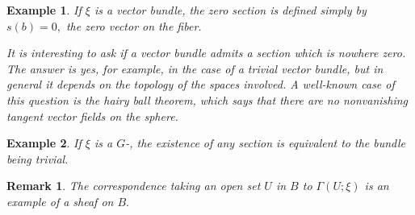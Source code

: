 \documentclass[12pt]{article}
\newtheorem{rmk}{Remark}
\newtheorem{exm}{Example}
\begin{document}
\begin{exm}
If $\xi$ is a vector bundle, the {\em zero section\/} is defined simply by
$s(b)=0,$ the zero vector on the fiber. 

It is interesting to ask if a  vector bundle admits a section which is 
nowhere zero. The answer is yes, for example, in the case of a trivial vector 
bundle, but in general it depends on the topology of the spaces involved.
A well-known case of this question is the {\em hairy ball theorem,} which
says that there are no nonvanishing tangent vector fields on the sphere.
\end{exm}

\begin{exm}
If $\xi$ is a  $G$-, the existence of {\em any\/} section is 
equivalent to the bundle being trivial.
\end{exm}

\begin{rmk}
The correspondence taking an open set $U$ in $B$ to $\Gamma(U;\xi)$ is an example
of a sheaf on $B.$
\end{rmk}
\end{document}
